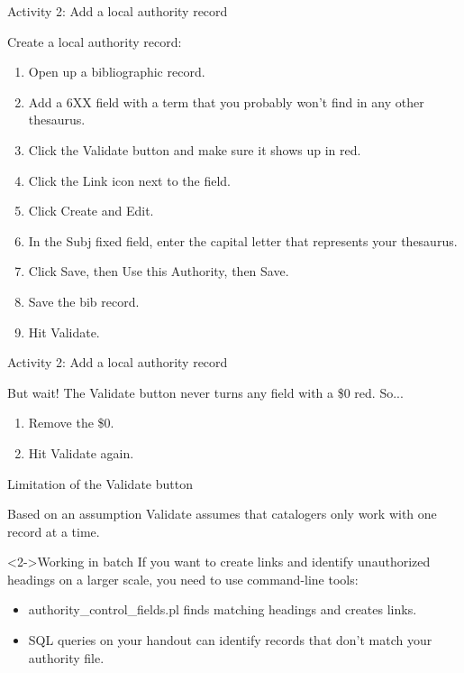 \documentclass{beamer}
\begin{document}
\begin{frame}{Activity 2: Add a local authority record}

Create a local authority record:
\begin{enumerate}
 \item Open up a bibliographic record.
 \item Add a 6XX field with a term that you probably won't find in any other thesaurus.  
 \item Click the Validate button and make sure it shows up in red.
 \item Click the Link icon next to the field.
 \item Click Create and Edit.
 \item In the Subj fixed field, enter the capital letter that represents your thesaurus.
 \item Click Save, then Use this Authority, then Save.
 \item Save the bib record.
 \item Hit Validate.
\end{enumerate}

\end{frame}


\begin{frame}{Activity 2: Add a local authority record}

But wait!  The Validate button never turns any field with a \$0 red.  So...
\begin{enumerate}
 \item Remove the \$0.
 \item Hit Validate again.
\end{enumerate}

\end{frame}

\begin{frame}{Limitation of the Validate button}
\begin{block}{Based on an assumption}
 Validate assumes that catalogers only work with one record at a time.
 \end{block}
 \begin{block}<2->{Working in batch}
  If you want to create links and identify unauthorized headings on a larger scale, you need to use command-line tools:
  \begin{itemize}
   \item authority\_control\_fields.pl finds matching headings and creates links.
   \item SQL queries on your handout can identify records that don't match your authority file.
  \end{itemize}


 \end{block}

\end{frame}
\end{document}

